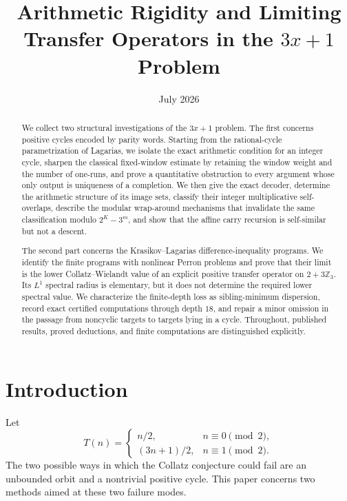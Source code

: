 \documentclass[11pt]{amsart}
\title{Arithmetic Rigidity and Limiting Transfer Operators in the $3x+1$ Problem}
\date{July 2026}
\numberwithin{equation}{section}
\begin{document}
\begin{abstract}
We collect two structural investigations of the $3x+1$ problem.  The first concerns positive cycles encoded by parity words.  Starting from the rational-cycle parametrization of Lagarias, we isolate the exact arithmetic condition for an integer cycle, sharpen the classical fixed-window estimate by retaining the window weight and the number of one-runs, and prove a quantitative obstruction to every argument whose only output is uniqueness of a completion.  We then give the exact decoder, determine the arithmetic structure of its image sets, classify their integer multiplicative self-overlaps, describe the modular wrap-around mechanisms that invalidate the same classification modulo $2^K-3^m$, and show that the affine carry recursion is self-similar but not a descent.

The second part concerns the Krasikov--Lagarias difference-inequality programs.  We identify the finite programs with nonlinear Perron problems and prove that their limit is the lower Collatz--Wielandt value of an explicit positive transfer operator on $2+3\mathbb Z_3$.  Its $L^1$ spectral radius is elementary, but it does not determine the required lower spectral value.  We characterize the finite-depth loss as sibling-minimum dispersion, record exact certified computations through depth $18$, and repair a minor omission in the passage from noncyclic targets to targets lying in a cycle.  Throughout, published results, proved deductions, and finite computations are distinguished explicitly.
\end{abstract}

\maketitle

\section{Introduction}

Let
\[
T(n)=\begin{cases}
 n/2,&n\equiv0\pmod2,\\
 (3n+1)/2,&n\equiv1\pmod2.
\end{cases}
\]
The two possible ways in which the Collatz conjecture could fail are an unbounded orbit and a nontrivial positive cycle.  This paper concerns two methods aimed at these two failure modes.
\end{document}
